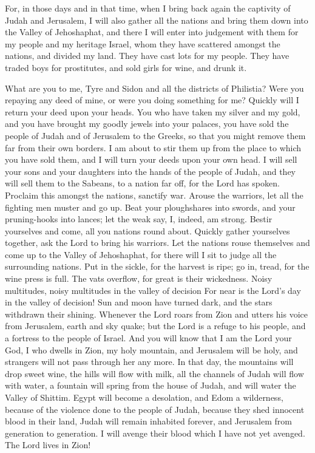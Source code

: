  For, in those days and in that time, when I bring back
again the captivity of Judah and Jerusalem,  I will also
gather all the nations and bring them down into the Valley of
Jehoshaphat, and there I will enter into judgement with them for my
people and my heritage Israel, whom they have scattered amongst the
nations, and divided my land.  They have cast lots for my
people. They have traded boys for prostitutes, and sold girls for wine,
and drunk it.

 What are you to me, Tyre and Sidon and all the districts of
Philistia? Were you repaying any deed of mine, or were you doing
something for me? Quickly will I return your deed upon your heads.
 You who have taken my silver and my gold, and you have
brought my goodly jewels into your palaces,  you have sold
the people of Judah and of Jerusalem to the Greeks, so that you might
remove them far from their own borders.  I am about to stir
them up from the place to which you have sold them, and I will turn your
deeds upon your own head.  I will sell your sons and your
daughters into the hands of the people of Judah, and they will sell them
to the Sabeans, to a nation far off, for the Lord has spoken.
 Proclaim this amongst the nations, sanctify war. Arouse the
warriors, let all the fighting men muster and go up.  Beat
your ploughshares into swords, and your pruning-hooks into lances; let
the weak say, I, indeed, am strong.  Bestir yourselves and
come, all you nations round about. Quickly gather yourselves together,
ask the Lord to bring his warriors.  Let the nations rouse
themselves and come up to the Valley of Jehoshaphat, for there will I
sit to judge all the surrounding nations.  Put in the
sickle, for the harvest is ripe; go in, tread, for the wine press is
full. The vats overflow, for great is their wickedness. 
Noisy multitudes, noisy multitudes in the valley of decision For near is
the Lord's day in the valley of decision!  Sun and moon
have turned dark, and the stars withdrawn their shining. 
Whenever the Lord roars from Zion and utters his voice from Jerusalem,
earth and sky quake; but the Lord is a refuge to his people, and a
fortress to the people of Israel.  And you will know that I
am the Lord your God, I who dwells in Zion, my holy mountain, and
Jerusalem will be holy, and strangers will not pass through her any
more.  In that day, the mountains will drop sweet wine, the
hills will flow with milk, all the channels of Judah will flow with
water, a fountain will spring from the house of Judah, and will water
the Valley of Shittim.  Egypt will become a desolation, and
Edom a wilderness, because of the violence done to the people of Judah,
because they shed innocent blood in their land,  Judah will
remain inhabited forever, and Jerusalem from generation to generation.
 I will avenge their blood which I have not yet avenged.
The Lord lives in Zion!
